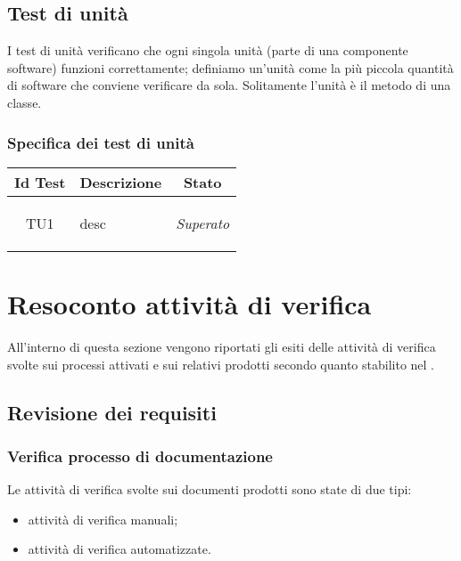 \subsection{Test di unità}
I test di unità verificano che ogni singola unità (parte di una componente software) funzioni correttamente; definiamo un'unità come la più piccola quantità di software che conviene verificare da sola. Solitamente l'unità è il metodo di una classe.

\subsubsection{Specifica dei test di unità}
\normalsize
\begin{longtable}{|c|>{}m{8cm}|c|}
\hline 
\textbf{Id Test} & \textbf{Descrizione} & \textbf{Stato} \\
\hline
\endhead
\hypertarget{TU1}{TU1} & desc & \textit{Superato} \\ \hline
\end{longtable}





\appendix


\section{Resoconto attività di verifica}
All'interno di questa sezione vengono riportati gli esiti delle attività di verifica svolte sui processi attivati e sui relativi prodotti secondo quanto stabilito nel \PdP.
	\subsection{Revisione dei requisiti}
		\subsubsection{Verifica processo di documentazione}
		Le attività di verifica svolte sui documenti prodotti sono state di due tipi:
		\begin{itemize}		
			\item attività di verifica manuali;
			\item attività di verifica automatizzate.
		\end{itemize}
		
